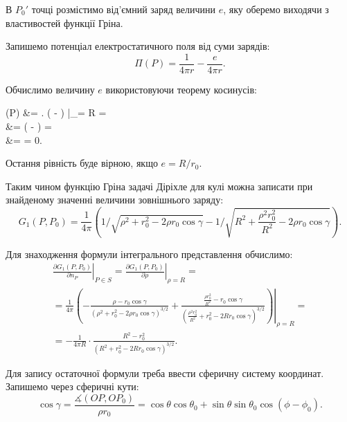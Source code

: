 В $P_0'$ точці розмістимо від'ємний заряд величини $e$, яку оберемо виходячи з властивостей функції Гріна. \medskip

Запишемо потенціал електростатичного поля від суми зарядів:
\begin{equation}
	\Pi(P) = \frac{1}{4 \pi r} - \frac{e}{4 \pi r}.
\end{equation}

Обчислимо величину $e$ використовуючи теорему косинусів:
\begin{nalign}
	\Pi(P) &=  \left. \left(  -  \right) \right|_{\rho = R} = \\
	&=   \left(  -  \right) = \\
	&=  \cdot {} = 0.
\end{nalign}

Остання рівність буде вірною, якщо $e = R / r_0$. \medskip

Таким чином функцію Гріна задачі Діріхле для кулі можна записати при знайденому значенні  величини зовнішнього заряду:
\begin{equation}
	G_1 (P, P_0) = \frac{1}{4\pi} \left( 1 / \sqrt{\rho^2 + r_0^2 - 2 \rho r_0 \cos \gamma} - 1 / \sqrt{R^2 + \frac{\rho^2 r_0^2}{R^2} - 2 \rho r_0 \cos \gamma} \right).
\end{equation}

Для знаходження формули інтегрального представлення обчислимо:
\begin{multline}
	\left. \frac{\partial G_1 (P, P_0)}{\partial n_P} \right|_{P \in S} = \left. \frac{\partial G_1 (P, P_0)}{\partial \rho} \right|_{\rho = R} = \\
	= \frac{1}{4 \pi} \left. \left( - \frac{\rho - r_0 \cos \gamma}{(\rho^2 + r_0^2 - 2 \rho r_0 \cos \gamma)^{3/2}} + \frac{\frac{\rho r_0^2}{R^2} - r_0 \cos \gamma}{\left(\frac{\rho^2 r_0^2}{R^2} + r_0^2 - 2 R r_0 \cos \gamma\right)^{3/2}} \right) \right|_{\rho = R} = \\
	= - \frac{1}{4 \pi R} \cdot \frac{R^2 - r_0^2}{(R^2 + r_0^2 - 2 R r_0 \cos \gamma)^{3/2}}.
\end{multline}

Для запису остаточної формули треба ввести сферичну систему координат. Запишемо через сферичні кути:
\begin{equation}
	\cos \gamma = \frac{\measuredangle (OP, OP_0)}{\rho r_0} = \cos \theta \cos \theta_0 + \sin \theta \sin \theta_0 \cos (\phi - \phi_0).
\end{equation}

